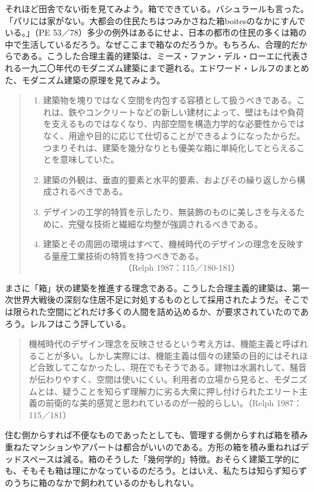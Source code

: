 \documentclass[b5j,twoside,twocolumn]{utarticle}
\begin{document}
それほど田舎でない街を見てみよう。箱でできている。バシュラールも言った。「パリには家がない。大都会の住民たちはつみかさねた箱boitesのなかにすんでいる。」（PE 53／78）多少の例外はあるにせよ、日本の都市の住民の多くは箱の中で生活しているだろう。なぜここまで箱なのだろうか。もちろん、合理的だからである。こうした合理主義的建築は、ミース・ファン・デル・ローエに代表される一九二〇年代のモダニズム建築にまで遡れる。エドワード・レルフのまとめた、モダニズム建築の原理を見てみよう。
\begin{quote}
\begin{enumerate}
\item  建築物を塊りではなく空間を内包する容積として扱うべきである。これは、鉄やコンクリートなどの新しい建材によって、壁はもはや負荷を支えるものではなくなり、内部空間を構造力学的な必要性からではなく、用途や目的に応じて仕切ることができるようになったからだ。つまりそれは、建築を幾分なりとも優美な箱に単純化してとらえることを意味していた。
\item 建築の外観は、垂直的要素と水平的要素、およびその繰り返しから構成されるべきである。
\item デザインの工学的特質を示したり、無装飾のものに美しさを与えるために、完璧な技術と繊細な均整が強調されるべきである。
\item 建築とその周囲の環境はすべて、機械時代のデザインの理念を反映する量産工業技術の特質を持つべきである。\\　　　　　　　　　　（Relph 1987：115／180-181）
\end{enumerate}
\end{quote}
まさに「箱」状の建築を推進する理念である。こうした合理主義的建築は、第一次世界大戦後の深刻な住居不足に対処するものとして採用されたようだ。そこでは限られた空間にどれだけ多くの人間を詰め込めるか、が要求されていたのであろう。レルフはこう評している。
\begin{quote}
機械時代のデザイン理念を反映させるという考え方は、機能主義と呼ばれることが多い。しかし実際には、機能主義は個々の建築の目的にはそれほど合致してこなかったし、現在でもそうである。建物は水漏れして、騒音が伝わりやすく、空間は使いにくい。利用者の立場から見ると、モダニズムとは、疑うことを知らず理解力に劣る大衆に押し付けられたエリート主義の前衛的な美的感覚と思われているのが一般的らしい。（Relph 1987：115／181）
\end{quote}
住む側からすれば不便なものであったとしても、管理する側からすれば箱を積み重ねたマンションやアパートは都合がいいのである。方形の箱を積み重ねればデッドスペースは減る。箱のそうした「幾何学的」特徴。おそらく建築工学的にも、そもそも箱は理にかなっているのだろう。とはいえ、私たちは知らず知らずのうちに箱のなかで飼われているのかもしれない。
\end{document}
